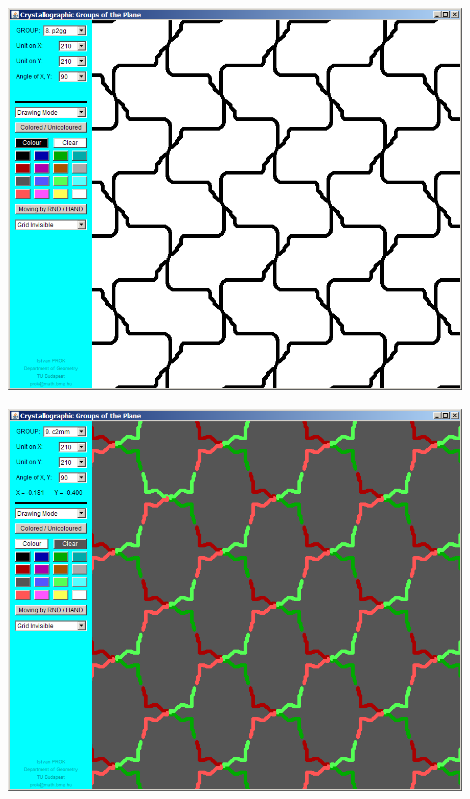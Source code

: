 \begin{frame}
  \includegraphics[width=0.9\textwidth]{illustration7.png}
\end{frame}

\begin{frame}
  \includegraphics[width=0.9\textwidth]{illustration8.png}
\end{frame}

